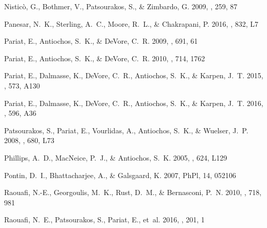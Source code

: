 \documentclass[twocolumn]{aastex6}
\newcommand{\phpl}{PhPl}
\begin{document}
\begin{thebibliography}{}
{Nistic{\`o}}, G., {Bothmer}, V., {Patsourakos}, S., \& {Zimbardo}, G. 2009,
  \solphys, 259, 87

{Panesar}, N.~K., {Sterling}, A.~C., {Moore}, R.~L., \& {Chakrapani}, P. 2016,
  \apjl, 832, L7

{Pariat}, E., {Antiochos}, S.~K., \& {DeVore}, C.~R. 2009, \apj, 691, 61

{Pariat}, E., {Antiochos}, S.~K., \& {DeVore}, C.~R. 2010, \apj, 714, 1762

{Pariat}, E., {Dalmasse}, K., {DeVore}, C.~R., {Antiochos}, S.~K., \& {Karpen},
  J.~T. 2015, \aap, 573, A130

{Pariat}, E., {Dalmasse}, K., {DeVore}, C.~R., {Antiochos}, S.~K., \& {Karpen},
  J.~T. 2016, \aap, 596, A36


{Patsourakos}, S., {Pariat}, E., {Vourlidas}, A., {Antiochos}, S.~K., \&
  {Wuelser}, J.~P. 2008, \apjl, 680, L73

{Phillips}, A.~D., {MacNeice}, P.~J., \& {Antiochos}, S.~K. 2005, \apjl, 624,
  L129

{Pontin}, D.~I., {Bhattacharjee}, A., \& {Galsgaard}, K. 2007, \phpl, 14,
  052106

{Raouafi}, N.-E., {Georgoulis}, M.~K., {Rust}, D.~M., \& {Bernasconi}, P.~N.
  2010, \apj, 718, 981
  
{Raouafi}, N.~E., {Patsourakos}, S., {Pariat}, E., {et~al.} 2016, \ssr, 201, 1


\end{thebibliography}
\end{document}
